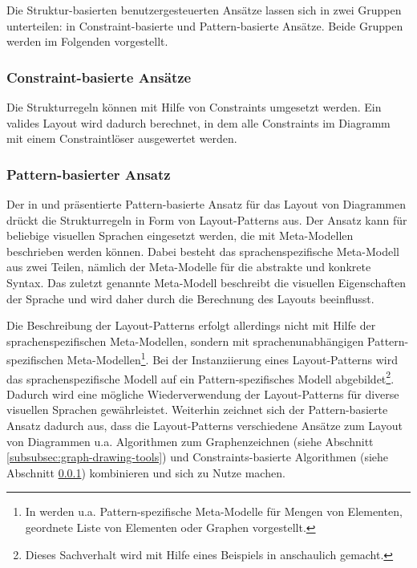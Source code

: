 Die Struktur-basierten benutzergesteuerten Ansätze lassen sich in zwei Gruppen unterteilen: in Constraint-basierte und Pattern-basierte Ansätze. Beide Gruppen werden im Folgenden vorgestellt.

\subsubsection{Constraint-basierte Ansätze}
\label{subsubsec:constraint-based-approaches}

Die Strukturregeln können mit Hilfe von Constraints umgesetzt werden. Ein valides Layout wird dadurch berechnet, in dem alle Constraints im Diagramm mit einem Constraintlöser ausgewertet werden.







\subsubsection{Pattern-basierter Ansatz}

Der in \cite{Maier12A-Pattern-based} und \cite{MaierMinas10Combination} präsentierte Pattern-basierte Ansatz für das Layout von Diagrammen drückt die Strukturregeln in Form von Layout-Patterns aus. Der Ansatz kann für beliebige visuellen Sprachen eingesetzt werden, die mit Meta-Modellen beschrieben werden können. Dabei besteht das sprachenspezifische Meta-Modell aus zwei Teilen, nämlich der Meta-Modelle für die abstrakte und konkrete Syntax. Das zuletzt genannte Meta-Modell beschreibt die visuellen Eigenschaften der Sprache und wird daher durch die Berechnung des Layouts beeinflusst.

Die Beschreibung der Layout-Patterns erfolgt allerdings nicht mit Hilfe der sprachenspezifischen Meta-Modellen, sondern mit sprachenunabhängigen Pattern-spezifischen Meta-Model\-len\footnote{In \cite{Maier12A-Pattern-based} werden u.a. Pattern-spezifische Meta-Modelle für Mengen von Elementen, geordnete Liste von Elementen oder Graphen vorgestellt.}. Bei der Instanziierung eines Layout-Patterns wird das sprachenspezifische Modell auf ein Pattern-spezifisches Modell abgebildet\footnote{Dieses Sachverhalt wird mit Hilfe eines Beispiels in \cite[S.59ff]{Maier12A-Pattern-based} anschaulich gemacht.}. Dadurch wird eine mögliche Wiederverwendung der Layout-Patterns für diverse visuellen Sprachen gewährleistet. Weiterhin zeichnet sich der Pattern-basierte Ansatz dadurch aus, dass die Layout-Patterns verschiedene Ansätze zum Layout von Diagrammen u.a. Algorithmen zum Graphenzeichnen (siehe Abschnitt \ref{subsubsec:graph-drawing-tools}) und Constraints-basierte Algorithmen (siehe Abschnitt \ref{subsubsec:constraint-based-approaches}) kombinieren und sich zu Nutze machen.



